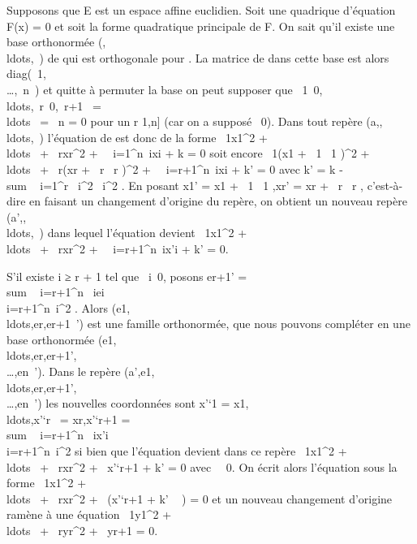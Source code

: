 Supposons que E est un espace affine euclidien. Soit \Sigma une quadrique
d'équation F(x) = 0 et soit \Phi la forme quadratique principale de F. On
sait qu'il existe une base orthonormée
(,\\ldots,\overrightarrowen~)
de \vecE qui est orthogonale pour \Phi. La matrice de \Phi
dans cette base est alors
diag(\lambda~1,\\\ldots,\lambda~n~)
et quitte à permuter la base on peut supposer que
\lambda~1\neq~0,\\ldots,\lambda~r\mathrel\neq~0,\lambda~r+1~
= \\ldots~ =
\lambda~n = 0 pour un r \in {[}1,n{]} (car on a supposé
\Phi\neq~0). Dans tout repère
(a,,\\ldots,\overrightarrowen~)
l'équation de \Sigma est donc de la forme \lambda~1x1^2 +
\\ldots~ +
\lambda~rxr^2 +\
\sum ~
i=1^n\alpha~ixi + k = 0 soit encore
\lambda~1(x1 + \alpha~1 \lambda~1 )^2 +
\\ldots~ +
\lambda~r(xr + \alpha~r \over
2\lambda~r )^2 +\
\sum ~
i=r+1^n\alpha~ixi + k' = 0 avec k' = k
-\\sum ~
i=1^r \alpha~i^2 \lambda~i^2 . En posant x1' = x1 +
\alpha~1 \lambda~1 ,xr' =
xr + \alpha~r \over 2\lambda~r ,
c'est-à-dire en faisant un changement d'origine du repère, on obtient un
nouveau repère
(a',\overrightarrowe1,\\ldots,\overrightarrowen~)
dans lequel l'équation devient \lambda~1x1^2 +
\\ldots~ +
\lambda~rxr^2 +\
\sum ~
i=r+1^n\alpha~ix'i + k' = 0.

S'il existe i ≥ r + 1 tel que \alpha~i\neq~0,
posons er+1' =
\\sum ~
i=r+1^n\alpha~ iei \over
\sqrt\\\sum
 i=r+1^n\alpha~i^2 . Alors
(e1,\\ldots,er,er+1~')
est une famille orthonormée, que nous pouvons compléter en une base
orthonormée
(e1,\\ldots,er,er+1',\\\ldots,en~').
Dans le repère
(a',e1,\\ldots,er,er+1',\\\ldots,en~')
les nouvelles coordonnées sont x'`1 =
x1,\\ldots,x'`r~
= xr,x'`r+1 =
\\sum ~
i=r+1^n\alpha~ ix'i \over
\sqrt\\\sum
 i=r+1^n\alpha~i^2 si bien que
l'équation devient dans ce repère \lambda~1x1^2 +
\\ldots~ +
\lambda~rxr^2 + \beta~x'`r+1 + k' = 0 avec
\beta~\neq~0. On écrit alors l'équation sous la forme
\lambda~1x1^2 +
\\ldots~ +
\lambda~rxr^2 + \beta~(x'`r+1 + k'
\over \beta~ ) = 0 et un nouveau changement d'origine ramène
à une équation \lambda~1y1^2 +
\\ldots~ +
\lambda~ryr^2 + \beta~yr+1 = 0.

